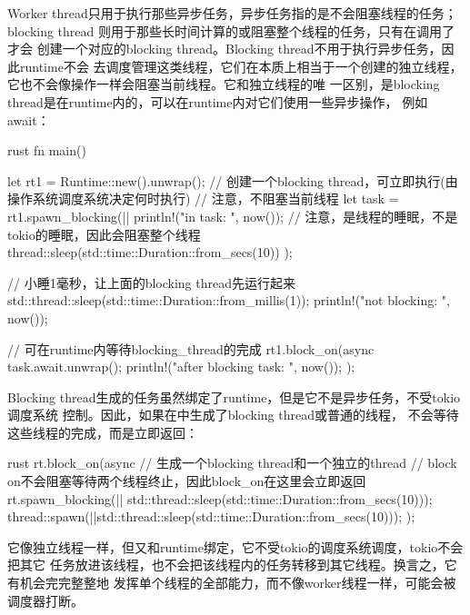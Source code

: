 Worker thread只用于执行那些异步任务，异步任务指的是不会阻塞线程的任务；blocking thread
则用于那些长时间计算的或阻塞整个线程的任务，只有在调用了才会
创建一个对应的blocking thread。Blocking thread不用于执行异步任务，因此runtime不会
去调度管理这类线程，它们在本质上相当于一个创建的独立线程，
它也不会像操作一样会阻塞当前线程。它和独立线程的唯
一区别，是blocking thread是在runtime内的，可以在runtime内对它们使用一些异步操作，
例如await：
\begin{code-block}{rust}
fn main() {
    let rt1 = Runtime::new().unwrap();
    // 创建一个blocking thread，可立即执行(由操作系统调度系统决定何时执行)
    // 注意，不阻塞当前线程
    let task = rt1.spawn_blocking(|| {
      println!("in task: {}", now());
      // 注意，是线程的睡眠，不是tokio的睡眠，因此会阻塞整个线程
      thread::sleep(std::time::Duration::from_secs(10))
    });

    // 小睡1毫秒，让上面的blocking thread先运行起来
    std::thread::sleep(std::time::Duration::from_millis(1));
    println!("not blocking: {}", now());

    // 可在runtime内等待blocking_thread的完成
    rt1.block_on(async {
      task.await.unwrap();
      println!("after blocking task: {}", now());
    });
}
\end{code-block}

Blocking thread生成的任务虽然绑定了runtime，但是它不是异步任务，不受tokio调度系统
控制。因此，如果在中生成了blocking thread或普通的线程，
不会等待这些线程的完成，而是立即返回：
\begin{code-block}{rust}
rt.block_on(async{
  // 生成一个blocking thread和一个独立的thread
  // block on不会阻塞等待两个线程终止，因此block_on在这里会立即返回
  rt.spawn_blocking(|| std::thread::sleep(std::time::Duration::from_secs(10)));
  thread::spawn(||std::thread::sleep(std::time::Duration::from_secs(10)));
});
\end{code-block}

它像独立线程一样，但又和runtime绑定，它不受tokio的调度系统调度，tokio不会把其它
任务放进该线程，也不会把该线程内的任务转移到其它线程。换言之，它有机会完完整整地
发挥单个线程的全部能力，而不像worker线程一样，可能会被调度器打断。

